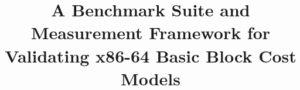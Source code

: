 \documentclass[conference]{IEEEtran}
\begin{document}
\title{A Benchmark Suite and Measurement Framework for Validating x86-64 Basic Block Cost Models}


\maketitle

\thispagestyle{plain}
\pagestyle{plain}














\vspace{12pt}
\end{document}
